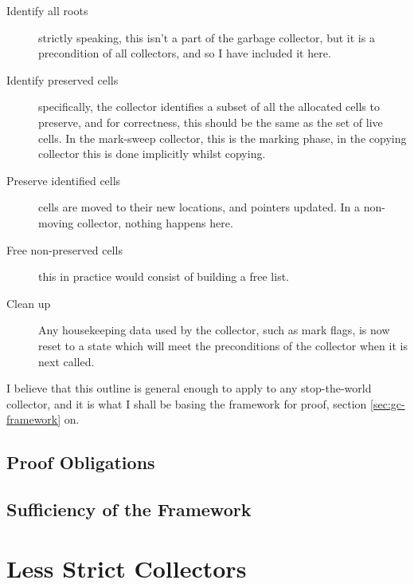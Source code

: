 \begin{description}
  \item[Identify all roots] strictly speaking, this isn't a part of
    the garbage collector, but it is a precondition of all collectors,
    and so I have included it here.

  \item[Identify preserved cells] specifically, the collector
    identifies a subset of all the allocated cells to preserve, and
    for correctness, this should be the same as the set of live
    cells. In the mark-sweep collector, this is the marking phase, in
    the copying collector this is done implicitly whilst copying.

  \item[Preserve identified cells] cells are moved to their new
    locations, and pointers updated. In a non-moving collector,
    nothing happens here.

  \item[Free non-preserved cells] this in practice would consist of
    building a free list.

  \item[Clean up] Any housekeeping data used by the collector, such as
    mark flags, is now reset to a state which will meet the
    preconditions of the collector when it is next called.
\end{description}

I believe that this outline is general enough to apply to any
stop-the-world collector, and it is what I shall be basing the
framework for proof, section \ref{sec:gc-framework} on.

\subsection{Proof Obligations}
\label{sec:gc-framework-obligations}


\subsection{Sufficiency of the Framework}
\label{sec:gc-framework-sufficiency}


\section{Less Strict Collectors}
\label{sec:gc-lessstrict}

